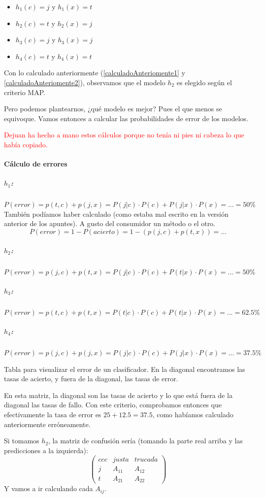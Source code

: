 \documentclass{apuntes}
\begin{document}
\begin{example}
\begin{itemize}
	\item $h_1(c) = j$ y $h_1(x) = t$ 
	\item $h_2(c) = t$ y $h_2(x) = j$ 
	\item $h_3(c) = j$ y $h_3(x) = j$ 
	\item $h_4(c) = t$ y $h_4(x) = t$ 
\end{itemize}

Con lo calculado anteriormente (\ref{calculadoAnteriomente1} y \ref{calculadoAnteriomente2}), observamos que el modelo $h_2$ es elegido según el criterio MAP. 

Pero podemos plantearnos, ¿qué modelo es mejor? Pues el que menos se equivoque. Vamos entonces a calcular las probabilidades de error de los modelos.

\textcolor{red}{Dejuan ha hecho a mano estos cálculos porque no tenía ni pies ni cabeza lo que había copiado.}

\paragraph{Cálculo de errores}
\subparagraph{$h_1$:} $P(error) = p(t,c) + p(j,x) = P(j|c)·P(c) + P(j|x)·P(x) = ... = 50\% $
También podíamos haber calculado (como estaba mal escrito en la versión anterior de los apuntes). A gusto del consumidor un método o el otro.
\[P(error) = 1-P(acierto) = 1 - (p(j,c) + p(t,x)) = ...\]

\subparagraph{$h_2$:} 
$P(error) = p(j,c) + p(t,x) = P(j|c)·P(c) + P(t|x)·P(x) = ... = 50\%$
\subparagraph{$h_3$:} 
$P(error) = p(t,c) + p(t,x) = P(t|c)·P(c) + P(t|x)·P(x) = ... = 62.5\%$
\subparagraph{$h_4$:} 
$P(error) = p(j,c) + p(j,x) = P(j|c)·P(c) + P(j|x)·P(x) = ... = 37.5\%$
\end{example}


 \begin{defn}
 	Tabla para visualizar el error de un clasificador. En la diagonal encontramos las tasas de acierto, y fuera de la diagonal, las tasas de error.
 \end{defn}


En esta matriz, la diagonal son las tasas de acierto y lo que está fuera de la diagonal las tasas de fallo. Con este criterio, comprobamos entonces que efectivamente la tasa de error es $25+12.5 = 37.5$, como habíamos calculado anteriormente erróneamente.


Si tomamos $h_2$, la matriz de confusión sería (tomando la parte real arriba y las predicciones a la izquierda):
\[
\begin{pmatrix}{ccc}
& justa & trucada \\\hline
j&A_{11}&A_{12}\\
t& A_{21}&A_{22}
\end{pmatrix}
\]
Y vamos a ir calculando cada $A_{ij}$.
\end{document}
